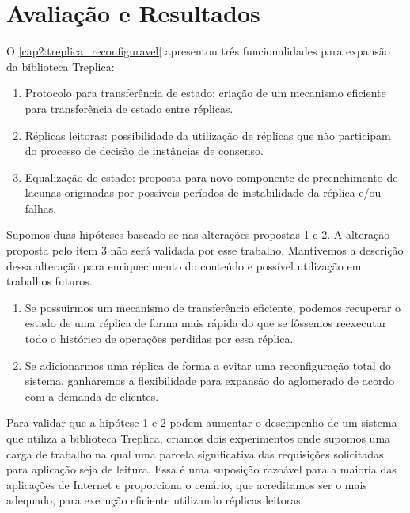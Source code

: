 \chapter{Avaliação e Resultados}\label{cap3}

O \autoref{cap2:treplica_reconfiguravel} apresentou três funcionalidades para expansão da
biblioteca Treplica:

\begin{enumerate}
  \item Protocolo para transferência de estado: criação de um mecanismo eficiente para
    transferência de estado entre réplicas.
  \item Réplicas leitoras: possibilidade da utilização de réplicas que não participam do
    processo de decisão de instâncias de consenso.
  \item Equalização de estado: proposta para novo componente de preenchimento de lacunas
    originadas por possíveis períodos de instabilidade da réplica e/ou falhas.
\end{enumerate}

Supomos duas hipóteses baseado-se nas alterações propostas 1 e 2. A alteração proposta
pelo item 3 não será validada por esse trabalho. Mantivemos a descrição dessa alteração
para enriquecimento do conteúdo e possível utilização em trabalhos futuros.

\begin{enumerate}
  \item Se possuirmos um mecanismo de transferência eficiente, podemos recuperar o estado
    de uma réplica de forma mais rápida do que se fôssemos reexecutar todo o histórico de
    operações perdidas por essa réplica.
  \item Se adicionarmos uma réplica de forma a evitar uma reconfiguração total do sistema,
    ganharemos a flexibilidade para expansão do aglomerado de acordo com a demanda de
    clientes.
\end{enumerate}

Para validar que a hipótese 1 e 2 podem aumentar o desempenho de um sistema que utiliza a
biblioteca Treplica, criamos dois experimentos onde supomos uma carga de trabalho na qual
uma parcela significativa das requisições solicitadas para aplicação seja de leitura. Essa
é uma suposição razoável para a maioria das aplicações de Internet \cite{tpc02} e
proporciona o cenário, que acreditamos ser o mais adequado, para execução eficiente
utilizando réplicas leitoras.

